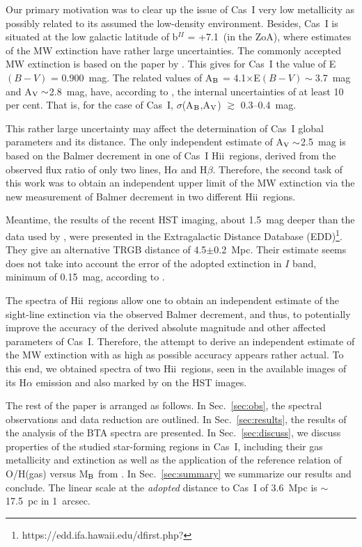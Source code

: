 \documentclass[useAMS,usenatbib]{mn2e}
\newcommand{\HII}{H{\sc ii}}
\begin{document}
Our primary motivation was to clear up the issue of Cas~I very low metallicity as possibly related
to its assumed the low-density environment. Besides, Cas~I is situated at the low galactic
latitude of b$^{II}$ = +7.1\degr\ (in the ZoA), where estimates of the MW extinction have rather large
uncertainties. The commonly accepted MW extinction is based on the paper by \citet{Schlafly11}.
This gives for Cas~I the value of E$(B-V)$ = 0.900~mag.
The related values of A$_{\rm B}$ =  4.1$\times$E$(B-V) \sim$3.7~mag and A$_{\rm V} \sim$2.8~mag,
have, according to  \citet{Schlegel98}, the internal uncertainties of at least 10 per cent. That is,
for the case of Cas~I, $\sigma$(A$_{\rm B}$,A$_{\rm V}$) $\gtrsim$ 0.3--0.4~mag.

This rather large uncertainty may affect the determination of Cas~I global parameters and its distance.
The only independent estimate of A$_{\rm V} \sim$2.5~mag \citep{WS1998} is based on the Balmer decrement in
one of Cas~I \HII\ regions, derived from the observed flux ratio of only two lines, H$\alpha$ and H$\beta$.
Therefore, the second task of this work was to obtain an independent upper limit of the MW extinction
via the new measurement of Balmer decrement in two different \HII\ regions.

Meantime, the results of the recent HST imaging, about 1.5~mag deeper than the data used by \citet{Tikhonov19},
were presented in the Extragalactic Distance Database (EDD)\footnote{https://\mbox{edd.ifa.hawaii.edu/dfirst.php?}}.
They give an alternative TRGB distance of 4.5$\pm$0.2~Mpc. Their estimate seems does not take
into account the error of the adopted extinction in $I$ band, minimum of 0.15~mag, according to \citet{Schlegel98}.

The spectra of \HII\ regions allow one to obtain an independent estimate of the sight-line extinction via the observed
Balmer decrement, and thus, to potentially improve the accuracy of the derived absolute magnitude and other affected
parameters of Cas~I.
Therefore, the attempt to derive an independent estimate
of the MW extinction with as high as possible accuracy appears rather actual.
To this end, we obtained spectra of two  \HII\ regions, seen in the available images of its H$\alpha$ emission
\citep{Kaisin2019} and also marked by \citet{Tikhonov19} on the HST images.

The rest of the paper is arranged as follows. In Sec.~\ref{sec:obs}, the spectral observations and data reduction
are outlined. In Sec.~\ref{sec:results}, the results of the analysis of the BTA spectra are presented.
In Sec.~\ref{sec:discuss}, we discuss properties of the studied star-forming regions in Cas~I, including their
gas metallicity and extinction as well as the application of the reference relation of  O/H(gas) versus M$_{\rm B}$
from \citet{Berg12}. In Sec.~\ref{sec:summary} we summarize our results and conclude.
The linear scale at the {\it adopted} distance to Cas~I of 3.6~Mpc is
$\sim$17.5~pc in 1~arcsec.
\end{document}
